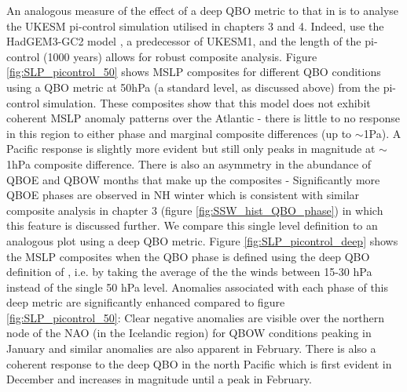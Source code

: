 An analogous measure of the effect of a deep QBO metric to that in \cite{andrewsObserved2019d} is to analyse the UKESM pi-control simulation utilised in chapters 3 and 4. Indeed, \cite{andrewsObserved2019d} use the HadGEM3-GC2 model \citep{williamsMet2018b}, a predecessor of UKESM1, and the length of the pi-control (1000 years) allows for robust composite analysis. Figure \ref{fig:SLP_picontrol_50} shows MSLP composites for different QBO conditions using a QBO metric at 50hPa (a standard level, as discussed above) from the pi-control simulation. These composites show that this model does not exhibit coherent MSLP anomaly patterns over the Atlantic - there is little to no response in this region to either phase and marginal composite differences (up to $\sim$1Pa). A Pacific response is slightly more evident but still only peaks in magnitude at $\sim$1hPa composite difference. There is also an asymmetry in the abundance of QBOE and QBOW months that make up the composites - Significantly more QBOE phases are observed in NH winter which is consistent with similar composite analysis in chapter 3 (figure \ref{fig:SSW_hist_QBO_phase}) in which this feature is discussed further. We compare this single level definition to an analogous plot using a deep QBO metric. Figure \ref{fig:SLP_picontrol_deep} shows the MSLP composites when the QBO phase is defined using the deep QBO definition of \cite{andrewsObserved2019d}, i.e. by taking the average of the the winds between 15-30 hPa instead of the single 50 hPa level. Anomalies associated with each phase of this deep metric are significantly enhanced compared to figure \ref{fig:SLP_picontrol_50}: Clear negative anomalies are visible over the northern node of the NAO (in the Icelandic region) for QBOW conditions peaking in January and similar anomalies are also apparent in February. There is also a coherent response to the deep QBO in the north Pacific which is first evident in December and increases in magnitude until a peak in February.

